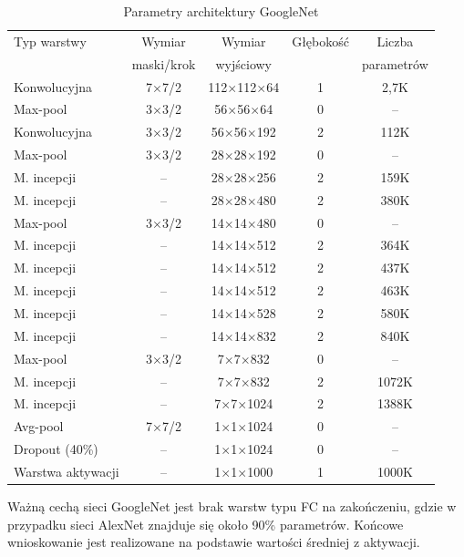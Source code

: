 \begin{table}[h!]
	\setlength{\tabcolsep}{14pt}
	\centering
	\caption{Parametry architektury GoogleNet}
	\scriptsize
	\label{tab:USG-params}
	\begin{tabular}{l | c | c | c | c }
		Typ warstwy  & Wymiar  & Wymiar & Głębokość & Liczba   \\  
		& maski/krok & wyjściowy &&parametrów\\
	    \hline \hline
		Konwolucyjna   & 7$\times$7/2 & 112$\times$112$\times$64 & 1 & 2,7K \\ \hline
		Max-pool & 3$\times$3/2 & 56$\times$56$\times$64 & 0 & --  \\ \hline
		Konwolucyjna & 3$\times$3/2 & 56$\times$56$\times$192 & 2 & 112K  \\ \hline
		Max-pool & 3$\times$3/2 & 28$\times$28$\times$192 & 0 & --  \\ \hline
		M. incepcji & -- & 28$\times$28$\times$256 & 2 & 159K  \\ \hline
		M. incepcji & -- & 28$\times$28$\times$480 & 2 & 380K  \\ \hline
		Max-pool & 3$\times$3/2 & 14$\times$14$\times$480 & 0 & --  \\ \hline
		M. incepcji & -- & 14$\times$14$\times$512 & 2 & 364K  \\ \hline
		M. incepcji & -- & 14$\times$14$\times$512 & 2 & 437K  \\ \hline
		M. incepcji & -- & 14$\times$14$\times$512 & 2 & 463K  \\ \hline
		M. incepcji & -- & 14$\times$14$\times$528 & 2 & 580K  \\ \hline
		M. incepcji & -- & 14$\times$14$\times$832 & 2 & 840K  \\ \hline
		Max-pool & 3$\times$3/2 & 7$\times$7$\times$832 & 0 & --  \\ \hline
		M. incepcji & -- & 7$\times$7$\times$832 & 2 & 1072K  \\ \hline
		M. incepcji & -- & 7$\times$7$\times$1024 & 2 & 1388K  \\ \hline
		Avg-pool & 7$\times$7/2 & 1$\times$1$\times$1024 & 0 & --  \\ \hline
		Dropout (40\%) & -- & 1$\times$1$\times$1024 & 0 & --  \\ \hline
		Warstwa aktywacji & -- & 1$\times$1$\times$1000 & 1 & 1000K  \\ \hline
	\end{tabular}
	\label{GoogleNetParams}
\end{table}
\renewcommand{\arraystretch}{1}
Ważną cechą sieci GoogleNet jest brak warstw typu FC na zakończeniu, gdzie \linebreak w przypadku sieci AlexNet znajduje się około 90\% parametrów. Końcowe wnioskowanie jest realizowane na podstawie wartości średniej z aktywacji.

